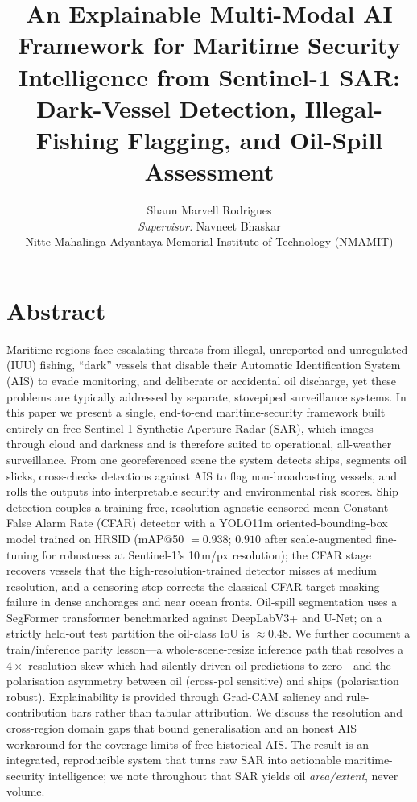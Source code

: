\documentclass[a4paper,11pt]{article}
\title{\textbf{An Explainable Multi-Modal AI Framework for Maritime Security
Intelligence from Sentinel-1 SAR: Dark-Vessel Detection, Illegal-Fishing
Flagging, and Oil-Spill Assessment}}
\author{
  Shaun Marvell Rodrigues\\
  \textit{Supervisor:} Navneet Bhaskar\\[2pt]
  Nitte Mahalinga Adyantaya Memorial Institute of Technology (NMAMIT)
}
\date{}
\begin{document}
\maketitle
\thispagestyle{empty}

\section*{Abstract}

Maritime regions face escalating threats from illegal, unreported and unregulated
(IUU) fishing, ``dark'' vessels that disable their Automatic Identification System
(AIS) to evade monitoring, and deliberate or accidental oil discharge, yet these
problems are typically addressed by separate, stovepiped surveillance systems. In
this paper we present a single, end-to-end maritime-security framework built
entirely on free Sentinel-1 Synthetic Aperture Radar (SAR), which images through
cloud and darkness and is therefore suited to operational, all-weather
surveillance. From one georeferenced scene the system detects ships, segments oil
slicks, cross-checks detections against AIS to flag non-broadcasting vessels, and
rolls the outputs into interpretable security and environmental risk scores. Ship
detection couples a training-free, resolution-agnostic censored-mean Constant False
Alarm Rate (CFAR) detector with a YOLO11m oriented-bounding-box model trained on
HRSID (mAP@50 $=0.938$; $0.910$ after scale-augmented fine-tuning for robustness at
Sentinel-1's 10\,m/px resolution); the CFAR stage recovers vessels that the
high-resolution-trained detector misses at medium resolution, and a censoring step
corrects the classical CFAR target-masking failure in dense anchorages and near
ocean fronts. Oil-spill segmentation uses a SegFormer transformer benchmarked
against DeepLabV3+ and U-Net; on a strictly held-out test partition the
oil-class IoU is $\approx0.48$. We further document a train/inference parity lesson---a
whole-scene-resize inference path that resolves a $4\times$ resolution skew which had
silently driven oil predictions to zero---and the polarisation asymmetry between
oil (cross-pol sensitive) and ships (polarisation robust). Explainability is
provided through Grad-CAM saliency and rule-contribution bars rather than tabular
attribution. We discuss the resolution and cross-region domain gaps that bound
generalisation and an honest AIS workaround for the coverage limits of free
historical AIS. The result is an integrated, reproducible system that turns raw SAR
into actionable maritime-security intelligence; we note throughout that SAR yields
oil \emph{area/extent}, never volume.
\end{document}
